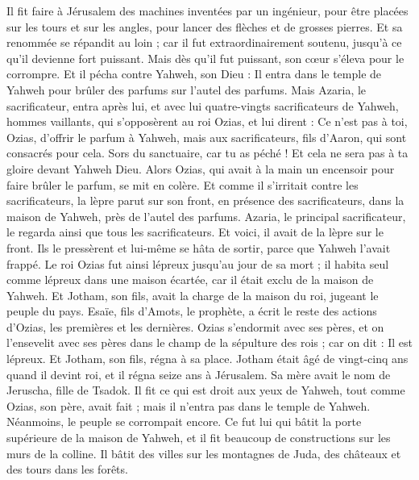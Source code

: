 \begin{multicols}{2}
Il fit faire à Jérusalem des machines inventées par un ingénieur, pour être placées sur les tours et sur les angles, pour lancer des flèches et de grosses pierres. Et sa renommée se répandit au loin ; car il fut extraordinairement soutenu, jusqu'à ce qu'il devienne fort puissant.
Mais dès qu'il fut puissant, son cœur s'éleva pour le corrompre. Et il pécha contre Yahweh, son Dieu : Il entra dans le temple de Yahweh pour brûler des parfums sur l'autel des parfums.
Mais Azaria, le sacrificateur, entra après lui, et avec lui quatre-vingts sacrificateurs de Yahweh, hommes vaillants,
qui s'opposèrent au roi Ozias, et lui dirent : Ce n'est pas à toi, Ozias, d'offrir le parfum à Yahweh, mais aux sacrificateurs, fils d'Aaron, qui sont consacrés pour cela. Sors du sanctuaire, car tu as péché ! Et cela ne sera pas à ta gloire devant Yahweh Dieu.
Alors Ozias, qui avait à la main un encensoir pour faire brûler le parfum, se mit en colère. Et comme il s'irritait contre les sacrificateurs, la lèpre parut sur son front, en présence des sacrificateurs, dans la maison de Yahweh, près de l'autel des parfums.
Azaria, le principal sacrificateur, le regarda ainsi que tous les sacrificateurs. Et voici, il avait de la lèpre sur le front. Ils le pressèrent et lui-même se hâta de sortir, parce que Yahweh l'avait frappé.
Le roi Ozias fut ainsi lépreux jusqu'au jour de sa mort ; il habita seul comme lépreux dans une maison écartée, car il était exclu de la maison de Yahweh. Et Jotham, son fils, avait la charge de la maison du roi, jugeant le peuple du pays.
Esaïe, fils d'Amots, le prophète, a écrit le reste des actions d'Ozias, les premières et les dernières.
Ozias s'endormit avec ses pères, et on l'ensevelit avec ses pères dans le champ de la sépulture des rois ; car on dit : Il est lépreux. Et Jotham, son fils, régna à sa place.
\VerseOne{}Jotham était âgé de vingt-cinq ans quand il devint roi, et il régna seize ans à Jérusalem. Sa mère avait le nom de Jeruscha, fille de Tsadok.
Il fit ce qui est droit aux yeux de Yahweh, tout comme Ozias, son père, avait fait ; mais il n'entra pas dans le temple de Yahweh. Néanmoins, le peuple se corrompait encore.
Ce fut lui qui bâtit la porte supérieure de la maison de Yahweh, et il fit beaucoup de constructions sur les murs de la colline.
Il bâtit des villes sur les montagnes de Juda, des châteaux et des tours dans les forêts.

\end{multicols}
